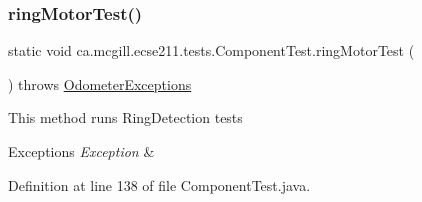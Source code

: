 \subsubsection{\texorpdfstring{ring\+Motor\+Test()}{ringMotorTest()}}
{\footnotesize\ttfamily static void ca.\+mcgill.\+ecse211.\+tests.\+Component\+Test.\+ring\+Motor\+Test (\begin{DoxyParamCaption}{ }\end{DoxyParamCaption}) throws \hyperlink{classca_1_1mcgill_1_1ecse211_1_1odometer_1_1_odometer_exceptions}{Odometer\+Exceptions}\hspace{0.3cm}{\ttfamily [static]}}

This method runs Ring\+Detection tests


\begin{DoxyExceptions}{Exceptions}
{\em Exception} & \\
\hline
\end{DoxyExceptions}


Definition at line 138 of file Component\+Test.\+java.



